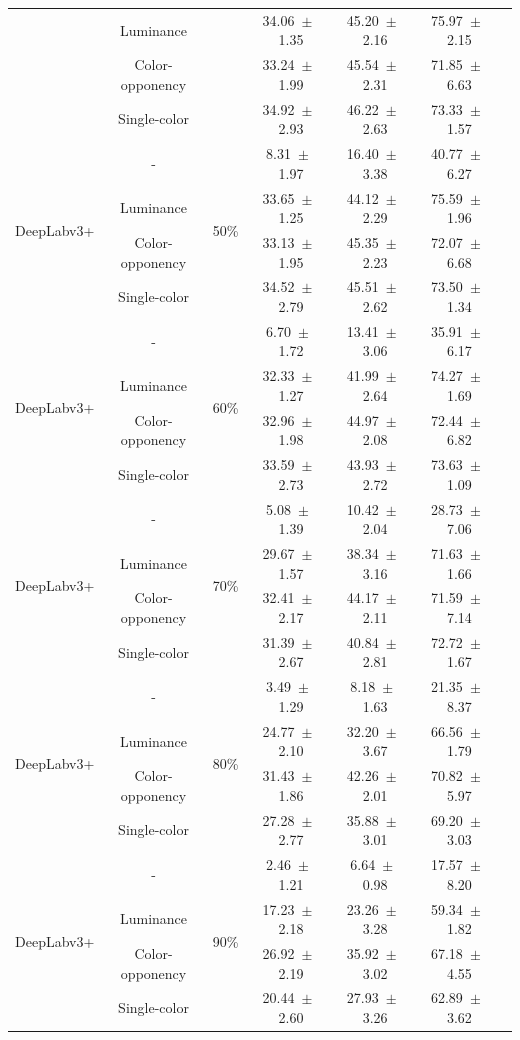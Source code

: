 \begin{table}[h]
\begin{tabular}{@{}lccc ccc@{}}
& Luminance & & 34.06~$\pm$~1.35 & 45.20~$\pm$~2.16 & 75.97~$\pm$~2.15 \\
& Color-opponency & & 33.24~$\pm$~1.99 & 45.54~$\pm$~2.31 & 71.85~$\pm$~6.63 \\
& Single-color & & 34.92~$\pm$~2.93 & 46.22~$\pm$~2.63 & 73.33~$\pm$~1.57 \\
\midrule
\multirow{4}{*}{DeepLabv3+} & - & \multirow{4}{*}{50\%} & 8.31~$\pm$~1.97 & 16.40~$\pm$~3.38 & 40.77~$\pm$~6.27 \\
& Luminance & & 33.65~$\pm$~1.25 & 44.12~$\pm$~2.29 & 75.59~$\pm$~1.96 \\
& Color-opponency & & 33.13~$\pm$~1.95 & 45.35~$\pm$~2.23 & 72.07~$\pm$~6.68 \\
& Single-color & & 34.52~$\pm$~2.79 & 45.51~$\pm$~2.62 & 73.50~$\pm$~1.34 \\
\midrule
\multirow{4}{*}{DeepLabv3+} & - & \multirow{4}{*}{60\%} & 6.70~$\pm$~1.72 & 13.41~$\pm$~3.06 & 35.91~$\pm$~6.17 \\
& Luminance & & 32.33~$\pm$~1.27 & 41.99~$\pm$~2.64 & 74.27~$\pm$~1.69 \\
& Color-opponency & & 32.96~$\pm$~1.98 & 44.97~$\pm$~2.08 & 72.44~$\pm$~6.82 \\
& Single-color & & 33.59~$\pm$~2.73 & 43.93~$\pm$~2.72 & 73.63~$\pm$~1.09 \\
\midrule
\multirow{4}{*}{DeepLabv3+} & - & \multirow{4}{*}{70\%} & 5.08~$\pm$~1.39 & 10.42~$\pm$~2.04 & 28.73~$\pm$~7.06 \\
& Luminance & & 29.67~$\pm$~1.57 & 38.34~$\pm$~3.16 & 71.63~$\pm$~1.66 \\
& Color-opponency & & 32.41~$\pm$~2.17 & 44.17~$\pm$~2.11 & 71.59~$\pm$~7.14 \\
& Single-color & & 31.39~$\pm$~2.67 & 40.84~$\pm$~2.81 & 72.72~$\pm$~1.67 \\
\midrule
\multirow{4}{*}{DeepLabv3+} & - & \multirow{4}{*}{80\%} & 3.49~$\pm$~1.29 & 8.18~$\pm$~1.63 & 21.35~$\pm$~8.37 \\
& Luminance & & 24.77~$\pm$~2.10 & 32.20~$\pm$~3.67 & 66.56~$\pm$~1.79 \\
& Color-opponency & & 31.43~$\pm$~1.86 & 42.26~$\pm$~2.01 & 70.82~$\pm$~5.97 \\
& Single-color & & 27.28~$\pm$~2.77 & 35.88~$\pm$~3.01 & 69.20~$\pm$~3.03 \\
\midrule
\multirow{4}{*}{DeepLabv3+} & - & \multirow{4}{*}{90\%} & 2.46~$\pm$~1.21 & 6.64~$\pm$~0.98 & 17.57~$\pm$~8.20 \\
& Luminance & & 17.23~$\pm$~2.18 & 23.26~$\pm$~3.28 & 59.34~$\pm$~1.82 \\
& Color-opponency & & 26.92~$\pm$~2.19 & 35.92~$\pm$~3.02 & 67.18~$\pm$~4.55 \\
& Single-color & & 20.44~$\pm$~2.60 & 27.93~$\pm$~3.26 & 62.89~$\pm$~3.62 \\
\midrule
\bottomrule
\end{tabular}
\label{tab:sparse_results_deeplabv3plus_acdc_full}
\end{table}